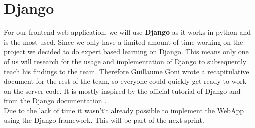 \documentclass[12pt]{article}
\begin{document}
\section{Django}\label{sec:django}
For our frontend web application, we will use \textbf{Django} as it works in python and is the most used.
Since we only have a limited amount of time working on the project we decided to do expert based learning on Django. This means only one of us will research for the usage and implementation of Django to subsequently teach his findings to the team. 
Therefore Guillaume Goni wrote a recapitulative document for the rest of the team, so everyone could quickly get ready to work on the server code.
It is mostly inspired by the official tutorial of Django \citep{Djangodocumentation2019} and from the Django documentation \citep{Django2019}.\\
Due to the lack of time it wasn't`t already possible to implement the WebApp using the Django framework. This will be part of the next sprint.
\end{document}
